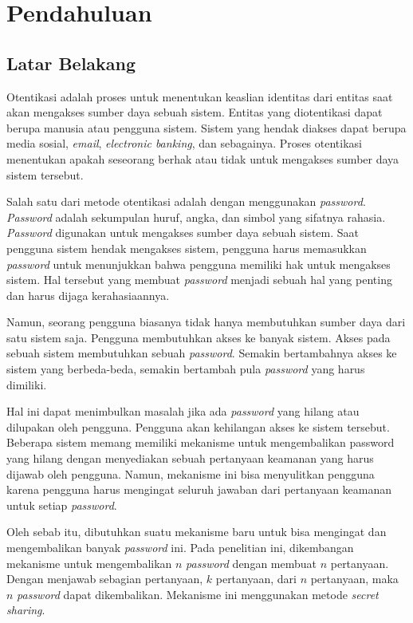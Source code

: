 \chapter{Pendahuluan} \label{chap:Pendahuluan}

\section{Latar Belakang}
\label{sec:latarbelakang}

Otentikasi adalah proses untuk menentukan keaslian identitas dari entitas saat akan mengakses sumber daya sebuah sistem\cite{stamp2011information}. Entitas yang diotentikasi dapat berupa manusia atau pengguna sistem. Sistem yang hendak diakses dapat berupa media sosial, \textit{email}, \textit{electronic banking}, dan sebagainya. Proses otentikasi menentukan apakah seseorang berhak atau tidak untuk mengakses sumber daya sistem tersebut.

Salah satu dari metode otentikasi adalah dengan menggunakan \textit{password}. \textit{Password} adalah sekumpulan huruf, angka, dan simbol yang sifatnya rahasia\cite{stamp2011information}. \textit{Password} digunakan untuk mengakses sumber daya sebuah sistem. Saat pengguna sistem hendak mengakses sistem, pengguna harus memasukkan \textit{password} untuk menunjukkan bahwa pengguna memiliki hak untuk mengakses sistem.
Hal tersebut yang membuat \textit{password} menjadi sebuah hal yang penting dan harus dijaga kerahasiaannya.

Namun, seorang pengguna biasanya tidak hanya membutuhkan sumber daya dari satu sistem saja. Pengguna membutuhkan akses ke banyak sistem. Akses pada sebuah sistem membutuhkan sebuah \textit{password}. Semakin bertambahnya akses ke sistem yang berbeda-beda, semakin bertambah pula \textit{password} yang harus dimiliki.

Hal ini dapat menimbulkan masalah jika ada \textit{password} yang hilang atau dilupakan oleh pengguna. Pengguna akan kehilangan akses ke sistem tersebut. Beberapa sistem memang memiliki mekanisme untuk mengembalikan password yang hilang dengan menyediakan sebuah pertanyaan keamanan yang harus dijawab oleh pengguna. Namun, mekanisme ini bisa menyulitkan pengguna karena pengguna harus mengingat seluruh jawaban dari pertanyaan keamanan untuk setiap \textit{password}.

Oleh sebab itu, dibutuhkan suatu mekanisme baru untuk bisa mengingat dan mengembalikan banyak \textit{password} ini. Pada penelitian ini, dikembangan mekanisme untuk mengembalikan $n$ \textit{password} dengan membuat $n$ pertanyaan. Dengan menjawab sebagian pertanyaan, $k$ pertanyaan, dari $n$ pertanyaan, maka $n$ \textit{password} dapat dikembalikan. Mekanisme ini menggunakan metode \textit{secret sharing}.

